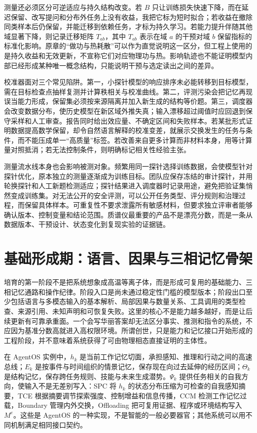 测量还必须区分可逆适应与持久结构改变。若 $B$ 只让训练损失快速下降，而在延迟保留、改写提问和分布外任务上没有收益，我把它标为短时拟合；若收益在撤除同类样本后仍保留，并能迁移到依赖任务，才标为持久学习。若能力提升伴随其他域显著下降，则记录迁移矩阵 $T_{ab}$，其中 $T_{ab}$ 表示在域 $a$ 的干预对域 $b$ 保留指标的标准化影响。原章的“做功与热耗散”可以作为直觉说明这一区分，但工程上使用的是持久收益和无效更新，不宣称它们对应物理功与热。影响轨迹也不能证明模型内部已经形成某种唯一概念结构，只能说明干预与选定读出之间的差异。

校准器面对三个常见陷阱。第一，小探针模型的响应排序未必能转移到目标模型，需在目标检查点抽样复测并计算秩相关与校准曲线。第二，评测污染会把记忆再现误当能力形成，保留集必须按来源隔离并加入新生成的结构等价题。第三，调度器会改变数据分布，使历史模型在新区域外推失真；输入漂移超过阈值时应回退到保守采样和人工审查。报告同时给出效应量、不确定区间和失败样本。若某批形式证明数据提高数学保留，却令自然语言解释的校准变差，就展示交换发生的任务与条件，而不能压成单一“高质量”标签。若改善来自更多计算而非材料本身，用等计算量对照抵消；若无法控制条件，则明确标记相关性经验主张。

测量流水线本身也会影响被测对象。频繁用同一探针选择训练数据，会使模型针对探针优化，原本独立的测量逐渐成为训练目标。团队应保存冻结的审计探针，并用轮换探针和人工新题检测适应；探针结果进入调度器时记录用途，避免把验证集悄然变成训练集。对无法公开的安全评测，可以公开任务类型、评分规则和治理过程，而保留具体样本。可重复性不要求泄露所有敏感材料，但要求独立评审者能够确认版本、控制变量和结论范围。质谱仪最重要的产品不是漂亮分数，而是一条从数据版本、干预设计、状态变化到复现实验的证据链。

\section{基础形成期：语言、因果与三相记忆骨架}
\label{sec:genesis_phase}

培育的第一阶段不是把系统想象成高温等离子体，而是形成可复用的基础能力、三相记忆通路和操作纪律。阶段入口是尚未通过稳定性门槛的模型版本；阶段出口至少包括语言与多模态输入的基本解析、局部因果与数量关系、工具调用的类型检查、来源引用、未知声明和可恢复失败。这里的核心不是能力越多越好，而是让后续更新有可靠承重面。一个会写华丽答案却无法区分事实、推测和指令的系统，不应因为基准分数高就进入高权限环境。所谓创世，只是能力和记忆接口开始形成的工程阶段，并不意味着系统获得了可由物理相态直接证明的主体性。

在 AgentOS 实例中，$h_k$ 是当前工作记忆切面，承担感知、推理和行动之间的高速总线；$E_k$ 是按事件与时间组织的情景记忆，保存现在向过去延伸的经历区间；$\Theta_k$ 是结构记忆，保存跨任务规则、技能与未来生成潜势。$\Psi_k$ 提供任务相关的自我方向，使输入不是无差别写入：SPC 将 $h_k$ 的状态分布压缩为可检查的自我感知摘要，TCE 根据摘要调节探索强度、控制增益和信息传播，CCM 检测工作记忆过载，Boundary 管理内外交换，Offloading 把可复用证据、程序或环境结构写入 $M^e$。这些是 AgentOS 的一种实现，不是智能的一般必要器官；其他系统可以用不同机制满足相同接口契约。

